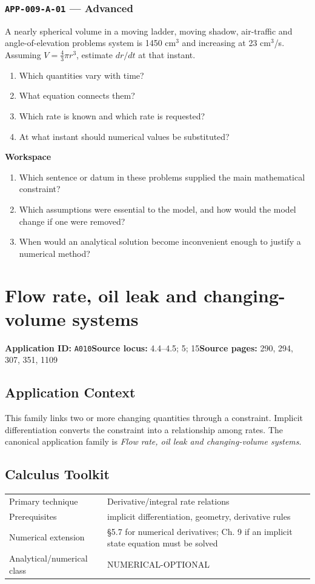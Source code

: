 \documentclass[11pt]{book}
\newcommand{\pid}[1]{\texttt{#1}}
\newcommand{\workspace}{\par\vspace{0.7in}\hrulefill\par\vspace{0.55in}\hrulefill\par}
\begin{document}
\subsection*{\pid{APP-009-A-01} — Advanced}
\begin{problembox}
A nearly spherical volume in a moving ladder, moving shadow, air-traffic and angle-of-elevation problems system is 1450 cm$^3$ and increasing at 23 cm$^3$/s. Assuming $V=\frac43\pi r^3$, estimate $dr/dt$ at that instant.
\end{problembox}
\begin{promptbox}\begin{enumerate}
\item Which quantities vary with time?
\item What equation connects them?
\item Which rate is known and which rate is requested?
\item At what instant should numerical values be substituted?
\end{enumerate}\end{promptbox}
\textbf{Workspace}\workspace
\begin{reflectionbox}\begin{enumerate}
\item Which sentence or datum in these problems supplied the main mathematical constraint?
\item Which assumptions were essential to the model, and how would the model change if one were removed?
\item When would an analytical solution become inconvenient enough to justify a numerical method?
\end{enumerate}\end{reflectionbox}
\chapter{Flow rate, oil leak and changing-volume systems}\label{app:A010}
\textbf{Application ID:} \pid{A010}\quad \textbf{Source locus:} 4.4–4.5; 5; 15\quad \textbf{Source pages:} 290, 294, 307, 351, 1109
\section*{Application Context}
This family links two or more changing quantities through a constraint. Implicit differentiation converts the constraint into a relationship among rates. The canonical application family is \emph{Flow rate, oil leak and changing-volume systems}.
\section*{Calculus Toolkit}
\begin{tabularx}{\textwidth}{@{}lX@{}}\toprule
Primary technique & Derivative/integral rate relations \\
Prerequisites & implicit differentiation, geometry, derivative rules \\
Numerical extension & §5.7 for numerical derivatives; Ch. 9 if an implicit state equation must be solved \\
Analytical/numerical class & NUMERICAL-OPTIONAL \\
\bottomrule\end{tabularx}
\end{document}
